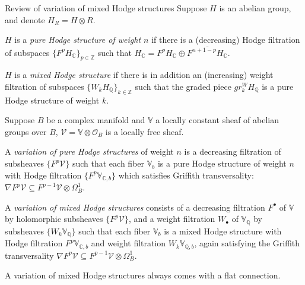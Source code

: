 \documentclass[8pt]{beamer}
\theoremstyle{definition}
\theoremstyle{remark}
\begin{document}
\begin{frame}[t]{Review of variation of mixed Hodge structures}
Suppose $H$ is an abelian group, and denote $H_R=H\otimes R$.

\begin{definition}
$H$ is a \textit{pure Hodge structure of weight $n$} if there is a (decreasing) Hodge filtration of subspaces $\{F^pH_{\mathbb C}\}_{p\in\mathbb Z}$ such that $H_{\mathbb C}=F^pH_{\mathbb C}\oplus\overline{F^{n+1-p}H_{\mathbb C}}$.

$H$ is a \textit{mixed Hodge structure} if there is in addition an (increasing) weight filtration of subspaces $\{W_kH_{\mathbb Q}\}_{k\in\mathbb Z}$ such that the graded piece $gr^W_kH_{\mathbb Q}$ is a pure Hodge structure of weight $k$.
\end{definition}

Suppose $B$ be a complex manifold and $\mathbb V$ a locally constant sheaf of abelian groups over $B$, $\mathcal V=\mathbb V\otimes\mathcal O_B$ is a locally free sheaf.

\begin{definition}
A \textit{variation of pure Hodge structures} of weight $n$ is a decreasing filtration of subsheaves $\{F^p\mathcal V\}$ such that each fiber $\mathbb V_{b}$ is a pure Hodge structure of weight $n$ with Hodge filtration $\{F^p\mathbb V_{\mathbb C,b}\}$ which satisfies Griffith transversality: $\nabla F^p\mathcal V\subseteq F^{p-1}\mathcal V\otimes\Omega^1_B$.

A \textit{variation of mixed Hodge structures} consists of a decreasing filtration $F^\bullet$ of $\mathbb V$ by holomorphic subsheaves $\{F^p\mathcal V\}$, and a weight filtration $W_\bullet$ of $\mathbb V_{\mathbb Q}$ by subsheaves $\{W_k\mathbb V_{\mathbb Q}\}$ such that each fiber $\mathbb V_b$ is a mixed Hodge structure with Hodge filtration $F^p\mathbb V_{\mathbb C,b}$ and weight filtration $W_k\mathbb V_{\mathbb Q,b}$, again satisfying the Griffith transversality $\nabla F^p\mathcal V\subseteq F^{p-1}\mathcal V\otimes\Omega^1_B$.
\end{definition}

A variation of mixed Hodge structures always comes with a flat connection.
\vspace{10pt}

\end{frame}
\end{document}

